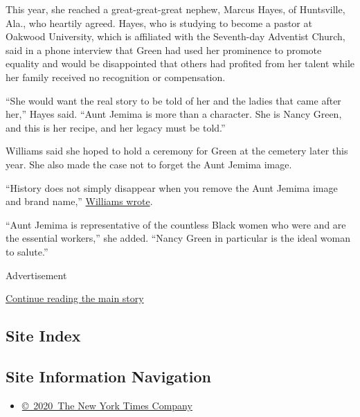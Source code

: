 This year, she reached a great-great-great nephew, Marcus Hayes, of
Huntsville, Ala., who heartily agreed. Hayes, who is studying to become
a pastor at Oakwood University, which is affiliated with the Seventh-day
Adventist Church, said in a phone interview that Green had used her
prominence to promote equality and would be disappointed that others had
profited from her talent while her family received no recognition or
compensation.

``She would want the real story to be told of her and the ladies that
came after her,'' Hayes said. ``Aunt Jemima is more than a character.
She is Nancy Green, and this is her recipe, and her legacy must be
told.''

Williams said she hoped to hold a ceremony for Green at the cemetery
later this year. She also made the case not to forget the Aunt Jemima
image.

``History does not simply disappear when you remove the Aunt Jemima
image and brand name,''
\href{https://bronzevillehistoricalsociety.wordpress.com/2020/06/23/aunt-jemima-removed-from-pancake-products-commentary-by-sherry-williams/}{Williams
wrote}.

``Aunt Jemima is representative of the countless Black women who were
and are the essential workers,'' she added. ``Nancy Green in particular
is the ideal woman to salute.''

Advertisement

\protect\hyperlink{after-bottom}{Continue reading the main story}

\hypertarget{site-index}{%
\subsection{Site Index}\label{site-index}}

\hypertarget{site-information-navigation}{%
\subsection{Site Information
Navigation}\label{site-information-navigation}}

\begin{itemize}
\tightlist
\item
  \href{https://help.nytimes.com/hc/en-us/articles/115014792127-Copyright-notice}{©~2020~The
  New York Times Company}
\end{itemize}

